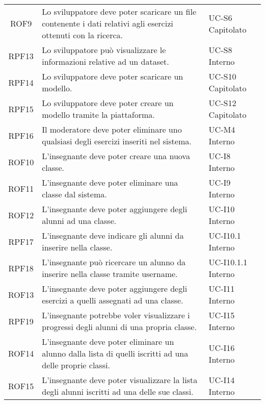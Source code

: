 \begin{tabularx}{\textwidth}{| c | p{10cm} | X |}
		ROF9 & Lo sviluppatore deve poter scaricare un file contenente i dati relativi agli esercizi ottenuti con la ricerca. & UC-S6 \newline Capitolato\\
		RPF13 & Lo sviluppatore può visualizzare le informazioni relative ad un dataset. & UC-S8 \newline Interno\\
		RPF14 & Lo sviluppatore deve poter scaricare un modello. & UC-S10 \newline Capitolato\\
		RPF15 & Lo sviluppatore deve poter creare un modello tramite la piattaforma. & UC-S12 \newline Capitolato\\ 
		RPF16 & Il moderatore deve poter eliminare uno qualsiasi degli esercizi inseriti nel sistema. & UC-M4 \newline Interno\\
		ROF10 & L'insegnante deve poter creare una nuova classe. & UC-I8 \newline Interno\\
		ROF11 & L'insegnante deve poter eliminare una classe dal sistema. & UC-I9 \newline Interno\\
		ROF12 & L'insegnante deve poter aggiungere degli alunni ad una classe. & UC-I10 \newline Interno\\
		RPF17 & L'insegnante deve indicare gli alunni da inserire nella classe. & UC-I10.1 \newline Interno\\
		RPF18 & L'insegnante può ricercare un alunno da inserire nella classe tramite username. & UC-I10.1.1 \newline Interno\\
		ROF13 & L'insegnante deve poter aggiungere degli esercizi a quelli assegnati ad una classe. & UC-I11 \newline Interno\\
		RPF19 & L'insegnante potrebbe voler visualizzare i progressi degli alunni di una propria classe. & UC-I15 \newline Interno\\
		ROF14 & L'insegnante deve poter eliminare un alunno dalla lista di quelli iscritti ad una delle proprie classi. & UC-I16 \newline Interno\\
		ROF15 & L'insegnante deve poter visualizzare la lista degli alunni iscritti ad una delle sue classi. & UC-I14 \newline Interno\\

\end{tabularx}
